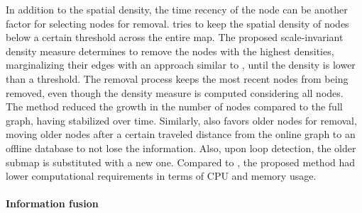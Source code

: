 In addition to the spatial density, the time recency of the node can be another factor for selecting nodes for removal.
\cite{kurz-et-al:2021:9636530} tries to keep the spatial density of nodes below a certain threshold across the entire map. The proposed scale-invariant density measure determines to remove the nodes with the highest densities, marginalizing their edges with an approach similar to \cite{kretzschmar-et-al:2010:2}, until the density is lower than a threshold. The removal process keeps the most recent nodes from being removed, even though the density measure is computed considering all nodes. The method reduced the growth in the number of nodes compared to the full graph, having stabilized over time.
Similarly, \cite{ali-et-al:2021:3100882} also favors older nodes for removal, moving older nodes after a certain traveled distance from the online graph to an offline database to not lose the information. Also, upon loop detection, the older submap is substituted with a new one. Compared to \cite{discussion:orb-slam2}, the proposed method had lower computational requirements in terms of CPU and memory usage.


\paragraph{Information fusion}

